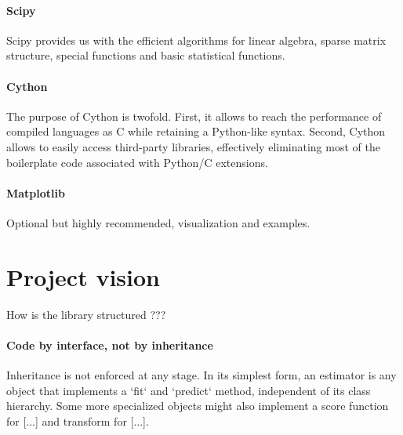 \documentclass[twoside,11pt]{article}
\begin{document}
\paragraph{Scipy} 

Scipy provides us with the efficient algorithms for linear algebra,
sparse matrix structure, special functions and basic statistical
functions.

\paragraph{Cython}

The purpose of Cython is twofold. First, it allows to reach the
performance of compiled languages as C while retaining a Python-like
syntax. Second, Cython allows to easily access third-party libraries,
effectively eliminating most of the boilerplate code associated with
Python/C extensions.

\paragraph{Matplotlib}

Optional but highly recommended, visualization and examples.



\section {Project vision}


How is the library structured ???


\paragraph{Code by interface, not by inheritance}

Inheritance is not enforced at any stage. In its simplest form, an
estimator is any object that implements a `fit` and `predict`
method, independent of its class hierarchy. Some more specialized
objects might also implement a score function for [...] and transform for
[...].


\end{document}
